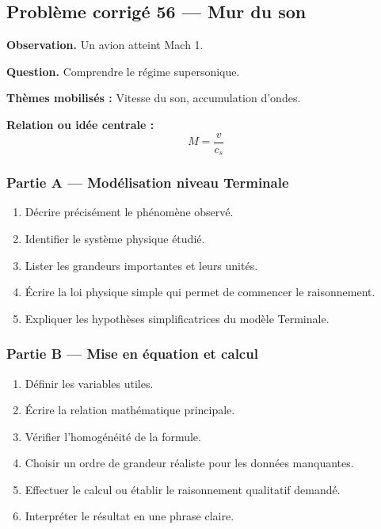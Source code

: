 \documentclass[11pt,a4paper]{article}
\begin{document}
\subsection{Problème corrigé 56 — Mur du son}

\begin{exercicebox}
\textbf{Observation.} Un avion atteint Mach 1.

\medskip
\textbf{Question.} Comprendre le régime supersonique.

\medskip
\textbf{Thèmes mobilisés :} Vitesse du son, accumulation d'ondes.

\medskip
\textbf{Relation ou idée centrale :}
\[
M=\frac{v}{c_s}
\]
\end{exercicebox}

\subsubsection*{Partie A — Modélisation niveau Terminale}

\begin{enumerate}
  \item Décrire précisément le phénomène observé.
  \item Identifier le système physique étudié.
  \item Lister les grandeurs importantes et leurs unités.
  \item Écrire la loi physique simple qui permet de commencer le raisonnement.
  \item Expliquer les hypothèses simplificatrices du modèle Terminale.
\end{enumerate}

\subsubsection*{Partie B — Mise en équation et calcul}

\begin{enumerate}
  \item Définir les variables utiles.
  \item Écrire la relation mathématique principale.
  \item Vérifier l'homogénéité de la formule.
  \item Choisir un ordre de grandeur réaliste pour les données manquantes.
  \item Effectuer le calcul ou établir le raisonnement qualitatif demandé.
  \item Interpréter le résultat en une phrase claire.
\end{enumerate}
\end{document}
